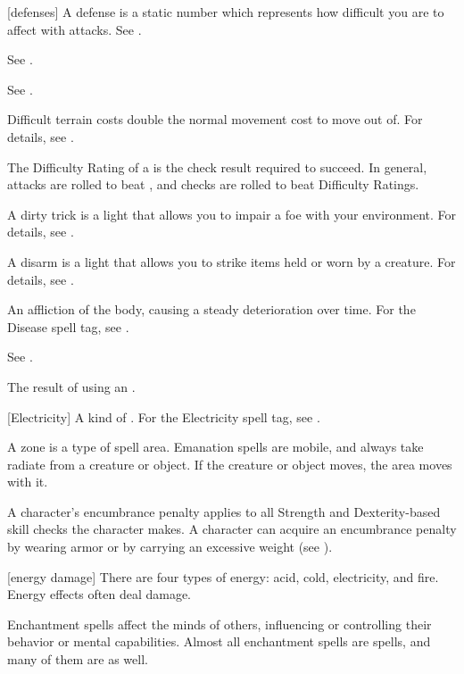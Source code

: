 [defenses] A defense is a static number which represents how difficult you are to affect with attacks. See .

 See .

 See .

 Difficult terrain costs double the normal movement cost to move out of.
For details, see .

 The Difficulty Rating of a  is the check result required to succeed.
In general, attacks are rolled to beat , and checks are rolled to beat Difficulty Ratings.

 A dirty trick is a light  that allows you to impair a foe with your environment.
For details, see .

 A disarm is a light  that allows you to strike items held or worn by a creature.
For details, see .

 An affliction of the body, causing a steady deterioration over time. For the Disease spell tag, see .

 See .

 The result of using an .

[Electricity] A kind of . For the Electricity spell tag, see .

 A zone is a type of spell area.
Emanation spells are mobile, and always take radiate from a creature or object.
If the creature or object moves, the area moves with it.

 A character's encumbrance penalty applies to all Strength and Dexterity-based skill checks the character makes.
A character can acquire an encumbrance penalty by wearing armor or by carrying an excessive weight (see ).

[energy damage] There are four types of energy: acid, cold, electricity, and fire. Energy effects often deal damage.

 Enchantment spells affect the minds of others, influencing or controlling their behavior or mental capabilities. Almost all enchantment spells are  spells, and many of them are  as well.

